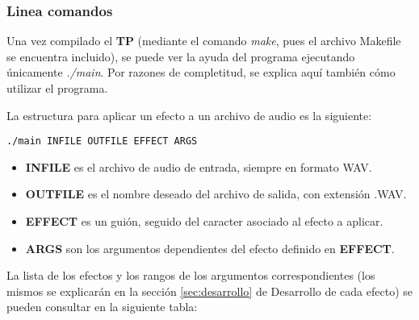 \subsubsection{Linea comandos}
\label{subsec:cli}
Una vez compilado el \textbf{TP} (mediante el comando \textit{make}, pues el archivo Makefile se encuentra incluido), se puede ver la ayuda del programa ejecutando únicamente \textit{./main}. Por razones de completitud, se explica aquí también cómo utilizar el programa. \vspace{\baselineskip}

La estructura para aplicar un efecto a un archivo de audio es la siguiente:

\lstset{language=bash}
\begin{lstlisting}[frame=single]
./main INFILE OUTFILE EFFECT ARGS
\end{lstlisting}

\begin{itemize}
 \item \textbf{INFILE} es el archivo de audio de entrada, siempre en formato WAV.
 \item \textbf{OUTFILE} es el nombre deseado del archivo de salida, con extensión .WAV.
 \item \textbf{EFFECT} es un guión, seguido del caracter asociado al efecto a aplicar.
 \item \textbf{ARGS} son los argumentos dependientes del efecto definido en \textbf{EFFECT}.
\end{itemize}

La lista de los efectos y los rangos de los argumentos correspondientes (los mismos se explicarán en la sección \ref{sec:desarrollo} de Desarrollo de cada efecto) se pueden consultar en la siguiente tabla:\vspace{\baselineskip}

